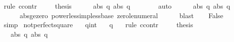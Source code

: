 \begin{isabellebody}
%
\isadelimproof
%
\endisadelimproof
%
\isatagproof
{}\isamarkupfalse%
\ {\isacharparenleft}rule\ ccontr{\isacharparenright}\isanewline
\ \ \isamarkupfalse%
\ {\isachardoublequoteopen}{\isasymnot}\ {\isacharquery}thesis{\isachardoublequoteclose}\isanewline
\ \ \isamarkupfalse%
\ {\isachardoublequoteopen}{}{\isacharcircum}{}\ {\isacharless}\ {\isacharparenleft}abs\ q{\isacharparenright}{\isacharcircum}{}{\isachardoublequoteclose}\ {\isachardoublequoteopen}{\isacharparenleft}abs\ q{\isacharparenright}{\isacharcircum}{}\ {\isacharless}\ {}{\isacharcircum}{}{\isachardoublequoteclose}\isanewline
\ \ \ \ \isamarkupfalse%
\ auto\isanewline
\ \ \isamarkupfalse%
\ {\isachardoublequoteopen}{}\ {\isacharless}\ abs\ q{\isachardoublequoteclose}\ {\isachardoublequoteopen}abs\ q\ {\isacharless}\ {}{\isachardoublequoteclose}\isanewline
\ \ \ \ \isamarkupfalse%
\ abs{\isacharunderscore}ge{\isacharunderscore}zero\ power{\isacharunderscore}less{\isacharunderscore}imp{\isacharunderscore}less{\isacharunderscore}base\ zero{\isacharunderscore}le{\isacharunderscore}numeral\isanewline
\ \ \ \ \isamarkupfalse%
\ blast{\isacharplus}\isanewline
\ \ \isamarkupfalse%
\ False\isanewline
\ \ \ \ \isamarkupfalse%
\ simp\isanewline
{}\isamarkupfalse%
%
\endisatagproof
{\isafoldproof}%
%
\isadelimproof
\isanewline
%
\endisadelimproof
\isanewline
{}\isamarkupfalse%
\ not{\isacharunderscore}perfect{\isacharunderscore}square{\isacharunderscore}{}{}{\isacharcolon}\isanewline
\ \ \ q{\isacharcolon}{\isacharcolon}int\isanewline
\ \ \ {\isachardoublequoteopen}q{\isacharcircum}{}\ {\isasymnoteq}\ {}{}{\isachardoublequoteclose}\isanewline
%
\isadelimproof
%
\endisadelimproof
%
\isatagproof
{}\isamarkupfalse%
\ {\isacharparenleft}rule\ ccontr{\isacharparenright}\isanewline
\ \ \isamarkupfalse%
\ {\isachardoublequoteopen}{\isasymnot}\ {\isacharquery}thesis{\isachardoublequoteclose}\isanewline
\ \ \isamarkupfalse%
\ {\isachardoublequoteopen}{}{\isacharcircum}{}\ {\isacharless}\ {\isacharparenleft}abs\ q{\isacharparenright}{\isacharcircum}{}{\isachardoublequoteclose}\ {\isachardoublequoteopen}{\isacharparenleft}abs\ q{\isacharparenright}{\isacharcircum}{}\ {\isacharless}\ {}{\isacharcircum}{}{\isachardoublequoteclose}\isanewline

\end{isabellebody}
